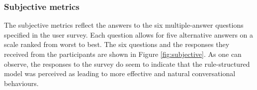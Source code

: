 \subsubsection*{Subjective metrics}

The subjective metrics reflect the answers to the six multiple-answer questions specified in the user survey. Each question allows for five alternative answers on a scale ranked from worst to best.  The six questions and the responses they received from the participants are shown in Figure \ref{fig:subjective}. As one can observe, the responses to the survey do seem to indicate that the rule-structured model was perceived as leading to more effective and natural conversational behaviours. 





